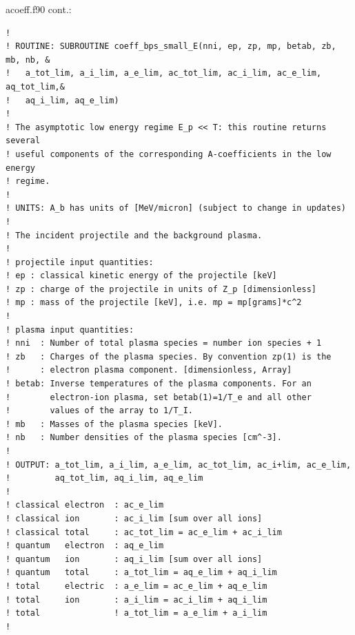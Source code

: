 \documentclass[preprint,12pt,eqsecnum,nofootinbib,amsmath,amssymb]{revtex4}
\begin{document}
\vskip1cm 
\noindent
acoeff.f90 cont.:
{
\baselineskip 10pt
\begin{verbatim}
! 
! ROUTINE: SUBROUTINE coeff_bps_small_E(nni, ep, zp, mp, betab, zb, mb, nb, &
!   a_tot_lim, a_i_lim, a_e_lim, ac_tot_lim, ac_i_lim, ac_e_lim, aq_tot_lim,&
!   aq_i_lim, aq_e_lim)
!
! The asymptotic low energy regime E_p << T: this routine returns several 
! useful components of the corresponding A-coefficients in the low energy
! regime.
!
! UNITS: A_b has units of [MeV/micron] (subject to change in updates)
!
! The incident projectile and the background plasma. 
!
! projectile input quantities:
! ep : classical kinetic energy of the projectile [keV]
! zp : charge of the projectile in units of Z_p [dimensionless]
! mp : mass of the projectile [keV], i.e. mp = mp[grams]*c^2
!
! plasma input quantities:
! nni  : Number of total plasma species = number ion species + 1
! zb   : Charges of the plasma species. By convention zp(1) is the 
!      : electron plasma component. [dimensionless, Array]
! betab: Inverse temperatures of the plasma components. For an
!        electron-ion plasma, set betab(1)=1/T_e and all other
!        values of the array to 1/T_I.
! mb   : Masses of the plasma species [keV]. 
! nb   : Number densities of the plasma species [cm^-3]. 
!
! OUTPUT: a_tot_lim, a_i_lim, a_e_lim, ac_tot_lim, ac_i+lim, ac_e_lim, 
!         aq_tot_lim, aq_i_lim, aq_e_lim
!
! classical electron  : ac_e_lim
! classical ion       : ac_i_lim [sum over all ions]
! classical total     : ac_tot_lim = ac_e_lim + ac_i_lim 
! quantum   electron  : aq_e_lim
! quantum   ion       : aq_i_lim [sum over all ions]
! quantum   total     : a_tot_lim = aq_e_lim + aq_i_lim
! total     electric  : a_e_lim = ac_e_lim + aq_e_lim
! total     ion       : a_i_lim = ac_i_lim + aq_i_lim
! total               ! a_tot_lim = a_e_lim + a_i_lim
!





\end{verbatim}}
\end{document}
